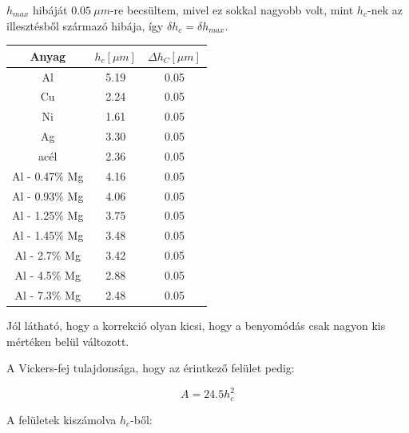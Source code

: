 \documentclass[a4paper,12pt]{article}
\begin{document}
\par $h_{max}$ hibáját $0.05 ~\mu m$-re becsültem, mivel ez sokkal nagyobb volt, mint $h_{c}$-nek az illesztésből származó hibája, így $\delta h_{c} = \delta h_{max}$.

\begin{center}
\begin{tabular}{|c|c|c|}
\hline
Anyag & $h_{c} [\mu m]$ & $\Delta h_{C} [\mu m]$ \\
\hline
Al &5.19 &0.05 \\
\hline
Cu &2.24 &0.05 \\
\hline
Ni &1.61 &0.05 \\
\hline
Ag& 3.30& 0.05\\
\hline
acél &2.36& 0.05 \\
\hline
Al - 0.47$\%$ Mg &  4.16& 0.05 \\
\hline
Al - 0.93$\%$ Mg& 4.06& 0.05 \\
\hline
Al - 1.25$\%$ Mg& 3.75& 0.05 \\
\hline
Al - 1.45$\%$ Mg &3.48& 0.05 \\
\hline
Al - 2.7$\%$ Mg &3.42& 0.05 \\
\hline
Al - 4.5$\%$ Mg &2.88& 0.05 \\
\hline
Al - 7.3$\%$ Mg &2.48& 0.05 \\
\hline
\end{tabular}
\end{center}

\par Jól látható, hogy a korrekció olyan kicsi, hogy a benyomódás csak nagyon kis mértéken belül változott.

\par A Vickers-fej tulajdonsága, hogy az érintkező felület pedig:

\begin{equation*}
A = 24.5h_{c}^{2}
\end{equation*}

\par A felületek kiszámolva $h_{c}$-ből:
\end{document}
